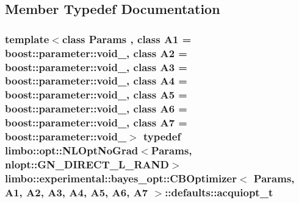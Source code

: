 \subsection{Member Typedef Documentation}
\hypertarget{structlimbo_1_1experimental_1_1bayes__opt_1_1_c_b_optimizer_1_1defaults_ad87ee1f502b5730ede0b4e46ef9b6437}{}
\subsubsection[{acquiopt\+\_\+t}]{\setlength{\rightskip}{0pt plus 5cm}template$<$class Params , class A1  = boost\+::parameter\+::void\+\_\+, class A2  = boost\+::parameter\+::void\+\_\+, class A3  = boost\+::parameter\+::void\+\_\+, class A4  = boost\+::parameter\+::void\+\_\+, class A5  = boost\+::parameter\+::void\+\_\+, class A6  = boost\+::parameter\+::void\+\_\+, class A7  = boost\+::parameter\+::void\+\_\+$>$ typedef {\bf limbo\+::opt\+::\+N\+L\+Opt\+No\+Grad}$<$Params, nlopt\+::\+G\+N\+\_\+\+D\+I\+R\+E\+C\+T\+\_\+\+L\+\_\+\+R\+A\+N\+D$>$ {\bf limbo\+::experimental\+::bayes\+\_\+opt\+::\+C\+B\+Optimizer}$<$ Params, A1, A2, A3, A4, A5, A6, A7 $>$\+::{\bf defaults\+::acquiopt\+\_\+t}}\label{structlimbo_1_1experimental_1_1bayes__opt_1_1_c_b_optimizer_1_1defaults_ad87ee1f502b5730ede0b4e46ef9b6437}
\hypertarget{structlimbo_1_1experimental_1_1bayes__opt_1_1_c_b_optimizer_1_1defaults_afbbb3a7663e1cabe65b094bca5bebc75}{}
